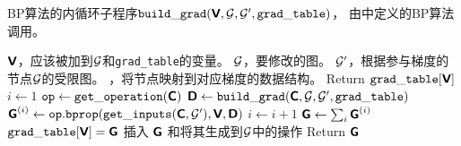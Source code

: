 \begin{algorithm}[ht]
\caption{\gls{BP}算法的内循环子程序${\tt build\_grad}(\textsf{\textbf{V}}, \mathcal{G}, \mathcal{G}', {\tt grad\_table})$，
由中定义的\gls{BP}算法调用。
}
\label{alg:build_grad}
\begin{algorithmic}
\REQUIRE $\textsf{\textbf{V}}$，应该被加到$\mathcal{G}$和{\tt grad\_table}的变量。
\REQUIRE $\mathcal{G}$，要修改的图。
\REQUIRE $\mathcal{G}'$，根据参与梯度的节点$\mathcal{G}$的受限图。
，将节点映射到对应梯度的数据结构。
 \STATE Return ${\tt grad\_table}[\textsf{\textbf{V}}]$
\ENDIF
\STATE $i \leftarrow 1$
\STATE ${\tt op} \leftarrow {\tt get\_operation}(\textsf{\textbf{C}})$
\STATE $\textsf{\textbf{D}} \leftarrow {\tt build\_grad}(\textsf{\textbf{C}}, \mathcal{G}, \mathcal{G}', {\tt grad\_table})$
\STATE $\textsf{\textbf{G}}^{(i)} \leftarrow {\tt op.bprop}({\tt get\_inputs}(\textsf{\textbf{C}}, \mathcal{G}'), \textsf{\textbf{V}}, \textsf{\textbf{D}})$ 
\STATE $i \leftarrow i + 1$
\ENDFOR
\STATE $\textsf{\textbf{G}} \leftarrow \sum_i \textsf{\textbf{G}}^{(i)}$
\STATE ${\tt grad\_table}[\textsf{\textbf{V}}] = \textsf{\textbf{G}}$
\STATE 插入 $\textsf{\textbf{G}}$ 和将其生成到$\mathcal{G}$中的操作
\STATE Return $\textsf{\textbf{G}}$
\end{algorithmic}
\end{algorithm}


  
